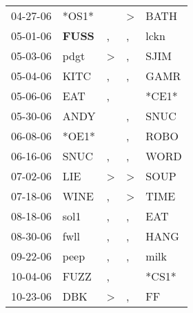 \begin{supertabular}{p{0.07\textwidth}p{0.06\textwidth}p{0.02\textwidth}p{0.02\textwidth}p{0.06\textwidth}}
          04-27-06\textsuperscript{} &                            *OS1* &                  &  \textgreater &           BATH\textsuperscript{} \\
          05-01-06\textsuperscript{} &  \textbf{FUSS\textsuperscript{}} &                , &             , &           lckn\textsuperscript{} \\
          05-03-06\textsuperscript{} &           pdgt\textsuperscript{} &     \textgreater &             , &           SJIM\textsuperscript{} \\
          05-04-06\textsuperscript{} &           KITC\textsuperscript{} &                , &             , &           GAMR\textsuperscript{} \\
          05-06-06\textsuperscript{} &            EAT\textsuperscript{} &                , &               &                            *CE1* \\
          05-30-06\textsuperscript{} &           ANDY\textsuperscript{} &                  &             , &           SNUC\textsuperscript{} \\
          06-08-06\textsuperscript{} &                            *OE1* &                  &             , &           ROBO\textsuperscript{} \\
          06-16-06\textsuperscript{} &           SNUC\textsuperscript{} &                , &             , &           WORD\textsuperscript{} \\
          07-02-06\textsuperscript{} &            LIE\textsuperscript{} &     \textgreater &  \textgreater &           SOUP\textsuperscript{} \\
          07-18-06\textsuperscript{} &           WINE\textsuperscript{} &                , &  \textgreater &           TIME\textsuperscript{} \\
          08-18-06\textsuperscript{} &           sol1\textsuperscript{} &                , &             , &            EAT\textsuperscript{} \\
          08-30-06\textsuperscript{} &           fwll\textsuperscript{} &                , &             , &           HANG\textsuperscript{} \\
          09-22-06\textsuperscript{} &           peep\textsuperscript{} &                , &             , &           milk\textsuperscript{} \\
          10-04-06\textsuperscript{} &           FUZZ\textsuperscript{} &                , &               &                            *CS1* \\
          10-23-06\textsuperscript{} &            DBK\textsuperscript{} &     \textgreater &             , &             FF\textsuperscript{} \\

\end{supertabular}
